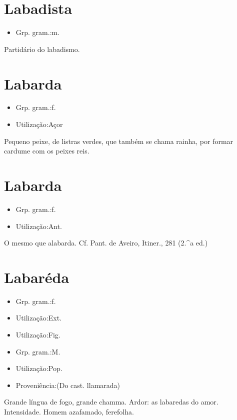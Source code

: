 \section{Labadista}
\begin{itemize}
\item {Grp. gram.:m.}
\end{itemize}
Partidário do labadismo.
\section{Labarda}
\begin{itemize}
\item {Grp. gram.:f.}
\end{itemize}
\begin{itemize}
\item {Utilização:Açor}
\end{itemize}
Pequeno peixe, de listras verdes, que também se chama \textunderscore rainha\textunderscore , por formar cardume com os peixes reis.
\section{Labarda}
\begin{itemize}
\item {Grp. gram.:f.}
\end{itemize}
\begin{itemize}
\item {Utilização:Ant.}
\end{itemize}
O mesmo que \textunderscore alabarda\textunderscore . Cf. Pant. de Aveiro, \textunderscore Itiner.\textunderscore , 281 (2.^a ed.)
\section{Labaréda}
\begin{itemize}
\item {Grp. gram.:f.}
\end{itemize}
\begin{itemize}
\item {Utilização:Ext.}
\end{itemize}
\begin{itemize}
\item {Utilização:Fig.}
\end{itemize}
\begin{itemize}
\item {Grp. gram.:M.}
\end{itemize}
\begin{itemize}
\item {Utilização:Pop.}
\end{itemize}
\begin{itemize}
\item {Proveniência:(Do cast. \textunderscore llamarada\textunderscore )}
\end{itemize}
Grande língua de fogo, grande chamma.
Ardor: \textunderscore as labaredas do amor\textunderscore .
Intensidade.
Homem azafamado, ferefolha.
